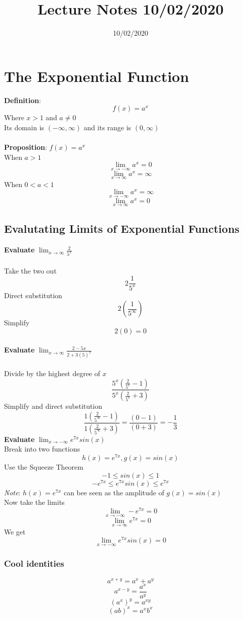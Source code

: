 \documentclass{article}
\title{Lecture Notes 10/02/2020}
\date{10/02/2020}
\begin{document}
\maketitle

\section{The Exponential Function}
\textbf{Definition}: 
\[f(x) = a^x\]
Where $x > 1$ and $a \neq 0$\\
Its domain is $(-\infty, \infty)$ and its range is $(0, \infty)$\\\\
\textbf{Proposition}: $f(x) = a^x$\\
When $a > 1$
\[\lim_{x \to -\infty}a^x = 0\]
\[\lim_{x \to \infty}a^x = \infty\]
When $0 < a < 1$
\[\lim_{x \to -\infty}a^x = \infty\]
\[\lim_{x \to \infty}a^x = 0\]

\subsection{Evalutating Limits of Exponential Functions}
\textbf{Evaluate} $\lim_{x \to \infty}\frac{2}{5^x}$\\\\
Take the two out
\[2\frac{1}{5^x}\]
Direct substitution
\[2(\frac{1}{5^\infty})\]
Simplify
\[2(0) = 0\]\\
\textbf{Evaluate} $\lim_{x \to \infty}\frac{2-5x}{2+3(5)^x}$\\\\
Divide by the highest degree of $x$
\[\frac{5^x(\frac{2}{5^x} - 1)}{5^x(\frac{2}{5^x} + 3)}\]
Simplify and direct substitution
\[\frac{1(\frac{2}{5^\infty} - 1)}{1(\frac{2}{5^\infty} + 3)} = \frac{(0 - 1)}{(0 + 3)} = -\frac{1}{3}\]
\textbf{Evaluate} $\lim_{x \to -\infty} e^{7x}sin(x)$\\
Break into two functions
\[h(x) = e^{7x}, g(x) = sin(x)\]
Use the Squeeze Theorem
\[-1 \leq sin(x) \leq 1\]
\[-e^{7x} \leq e^{7x}sin(x) \leq e^{7x}\]
\textit{Note}: $h(x) = e^{7x}$ can bee seen as the amplitude of $g(x) = sin(x)$\\
Now take the limits
\[\lim_{x \to -\infty}-e^{7x} = 0\]
\[\lim_{x \to \infty}e^{7x} = 0\]
We get
\[\lim_{x \to -\infty}e^{7x}sin(x) = 0\]
\subsubsection{Cool identities}
\[a^{x+y} = a^x + a^y\]
\[a^{x-y} = \frac{a^x}{a^y}\]
\[(a^x)^y = a^{xy}\]
\[(ab)^x = a^x b^x\]
\end{document}
